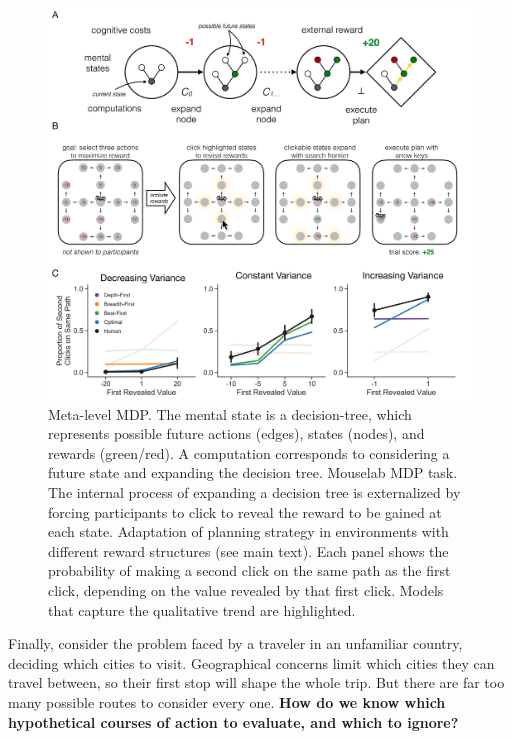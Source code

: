 \documentclass[11pt,a4paperpaper,]{article}
\begin{document}
\begin{figure}[ph]
  \centering
  \includegraphics[width=\textwidth]{diagrams/precis/planning.pdf}
  \caption{
     Meta-level MDP. The mental state is a decision-tree, which represents possible future actions (edges), states (nodes), and rewards (green/red). A computation corresponds to considering a future state and expanding the decision tree.
     Mouselab MDP task. The internal process of expanding a decision tree is externalized by forcing participants to click to reveal the reward to be gained at each state.
     Adaptation of planning strategy in environments with different reward structures (see main text). Each panel shows the probability of making a second click on the same path as the first click, depending on the value revealed by that first click. Models that capture the qualitative trend are highlighted. %
  }
  \label{fig:planning}
\end{figure}


Finally, consider the problem faced by a traveler in an unfamiliar country, deciding which cities to visit. Geographical concerns limit which cities they can travel between, so their first stop will shape the whole trip. But there are far too many possible routes to consider every one. \textbf{How do we know which hypothetical courses of action to evaluate, and which to ignore?}
\end{document}

